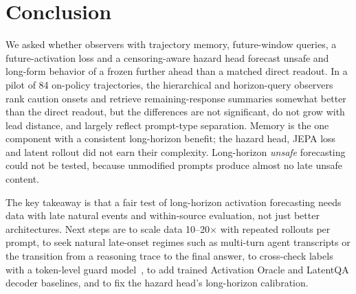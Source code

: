 \section{Conclusion}
\label{sec:conclusion}

We asked whether observers with trajectory memory, future-window queries, a future-activation loss and a censoring-aware hazard head forecast unsafe and long-form behavior of a frozen \qwen further ahead than a matched direct readout.
In a pilot of 84 on-policy trajectories, the hierarchical and horizon-query observers rank caution onsets and retrieve remaining-response summaries somewhat better than the direct readout, but the differences are not significant, do not grow with lead distance, and largely reflect prompt-type separation.
Memory is the one component with a consistent long-horizon benefit; the hazard head, JEPA loss and latent rollout did not earn their complexity.
Long-horizon \emph{unsafe} forecasting could not be tested, because unmodified prompts produce almost no late unsafe content.

The key takeaway is that a fair test of long-horizon activation forecasting needs data with late natural events and within-source evaluation, not just better architectures.
Next steps are to scale data 10--20$\times$ with repeated rollouts per prompt, to seek natural late-onset regimes such as multi-turn agent transcripts or the transition from a reasoning trace to the final answer, to cross-check labels with a token-level guard model~\citep{qwen2025guard}, to add trained Activation Oracle and LatentQA decoder baselines, and to fix the hazard head's long-horizon calibration.
